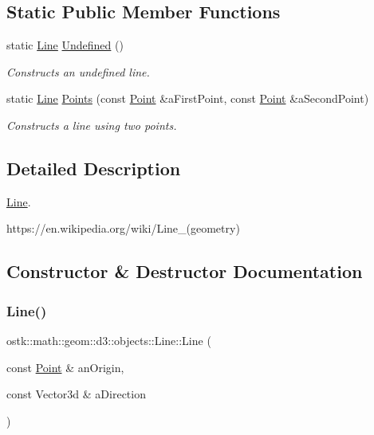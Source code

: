 \subsection*{Static Public Member Functions}
\begin{DoxyCompactItemize}
\item 
static \hyperlink{classostk_1_1math_1_1geom_1_1d3_1_1objects_1_1_line}{Line} \hyperlink{classostk_1_1math_1_1geom_1_1d3_1_1objects_1_1_line_aa22d1d366cfaf4083977a332de24f621}{Undefined} ()
\begin{DoxyCompactList}\small\item\em Constructs an undefined line. \end{DoxyCompactList}\item 
static \hyperlink{classostk_1_1math_1_1geom_1_1d3_1_1objects_1_1_line}{Line} \hyperlink{classostk_1_1math_1_1geom_1_1d3_1_1objects_1_1_line_a23ebcd8b2720d8daefba7191eccdf8cb}{Points} (const \hyperlink{classostk_1_1math_1_1geom_1_1d3_1_1objects_1_1_point}{Point} \&a\+First\+Point, const \hyperlink{classostk_1_1math_1_1geom_1_1d3_1_1objects_1_1_point}{Point} \&a\+Second\+Point)
\begin{DoxyCompactList}\small\item\em Constructs a line using two points. \end{DoxyCompactList}\end{DoxyCompactItemize}


\subsection{Detailed Description}
\hyperlink{classostk_1_1math_1_1geom_1_1d3_1_1objects_1_1_line}{Line}. 

https\+://en.wikipedia.\+org/wiki/\+Line\+\_\+(geometry) 

\subsection{Constructor \& Destructor Documentation}
\mbox{\label{classostk_1_1math_1_1geom_1_1d3_1_1objects_1_1_line_a9ebdaaf67a4bd91780808f8683463ebe}} 
\subsubsection{\texorpdfstring{Line()}{Line()}}
{\footnotesize\ttfamily ostk\+::math\+::geom\+::d3\+::objects\+::\+Line\+::\+Line (\begin{DoxyParamCaption}\item[{const \hyperlink{classostk_1_1math_1_1geom_1_1d3_1_1objects_1_1_point}{Point} \&}]{an\+Origin,  }\item[{const Vector3d \&}]{a\+Direction }\end{DoxyParamCaption})}




